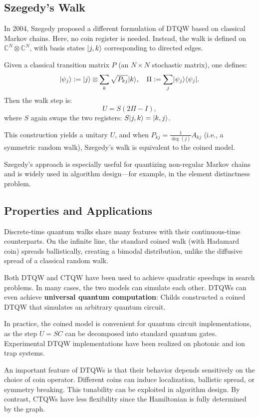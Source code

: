 \documentclass[12pt]{report}
\begin{document}
\subsection{Szegedy’s Walk}

In 2004, Szegedy \cite{Szegedy2004} proposed a different formulation of DTQW based on classical Markov chains. Here, no coin register is needed. Instead, the walk is defined on $\mathbb{C}^N \otimes \mathbb{C}^N$, with basis states $\lvert j,k\rangle$ corresponding to directed edges.

Given a classical transition matrix $P$ (an $N \times N$ stochastic matrix), one defines:
\[
\lvert\psi_j\rangle := \lvert j\rangle \otimes \sum_k \sqrt{P_{kj}} \lvert k\rangle,
\quad
\Pi := \sum_j \lvert\psi_j\rangle\langle\psi_j\rvert.
\]
Then the walk step is:
\[
U = S (2\Pi - I),
\]
where $S$ again swaps the two registers: $S\lvert j,k\rangle = \lvert k,j\rangle$.

This construction yields a unitary $U$, and when $P_{kj} = \frac{1}{\deg(j)} A_{kj}$ (i.e., a symmetric random walk), Szegedy’s walk is equivalent to the coined model.

Szegedy’s approach is especially useful for quantizing non-regular Markov chains and is widely used in algorithm design—for example, in the element distinctness problem.

\subsection{Properties and Applications}

Discrete-time quantum walks share many features with their continuous-time counterparts. On the infinite line, the standard coined walk (with Hadamard coin) spreads ballistically, creating a bimodal distribution, unlike the diffusive spread of a classical random walk.

Both DTQW and CTQW have been used to achieve quadratic speedups in search problems. In many cases, the two models can simulate each other. DTQWs can even achieve \textbf{universal quantum computation}: Childs\cite{Childs2009} constructed a coined DTQW that simulates an arbitrary quantum circuit.

In practice, the coined model is convenient for quantum circuit implementations, as the step $U = SC$ can be decomposed into standard quantum gates. Experimental DTQW implementations have been realized on photonic and ion trap systems.

An important feature of DTQWs is that their behavior depends sensitively on the choice of coin operator. Different coins can induce localization, ballistic spread, or symmetry breaking. This tunability can be exploited in algorithm design. By contrast, CTQWs have less flexibility since the Hamiltonian is fully determined by the graph.
\end{document}
